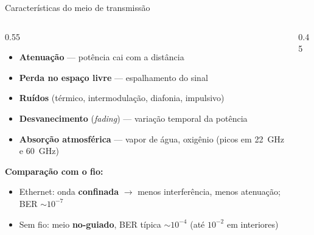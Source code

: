 \documentclass[aspectratio=169,11pt]{beamer}
\begin{document}
\begin{frame}{Características do meio de transmissão}
  \begin{columns}
    \begin{column}{0.55\textwidth}
      \begin{itemize}
        \item \textbf{Atenuação} --- potência cai com a distância
        \item \textbf{Perda no espaço livre} --- espalhamento do sinal
        \item \textbf{Ruídos} (térmico, intermodulação, diafonia, impulsivo)
        \item \textbf{Desvanecimento} (\emph{fading}) --- variação temporal da potência
        \item \textbf{Absorção atmosférica} --- vapor de água, oxigênio (picos em 22~GHz e 60~GHz)
      \end{itemize}
      \vspace{0.2cm}
      \textbf{Comparação com o fio:}
      \begin{itemize}
        \item Ethernet: onda \textbf{confinada} $\rightarrow$ menos interferência, menos atenuação; BER $\sim 10^{-7}$
        \item Sem fio: meio \textbf{no-guiado}, BER típica $\sim 10^{-4}$ (até $10^{-2}$ em interiores)
      \end{itemize}
    \end{column}
    \begin{column}{0.45\textwidth}
      \begin{center}
      \end{center}
    \end{column}
  \end{columns}
\end{frame}
\end{document}
